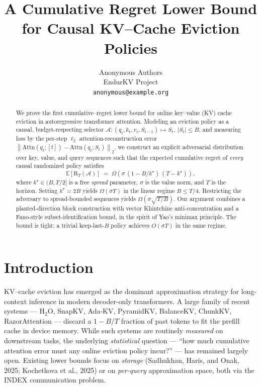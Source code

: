 \documentclass{article}
\title{A Cumulative Regret Lower Bound for Causal KV--Cache Eviction Policies}
\author{%
  Anonymous Authors \\
  EndurKV Project \\
  \texttt{anonymous@example.org}
}
\theoremstyle{definition}
\theoremstyle{remark}
\newcommand{\E}{\mathbb{E}}
\newcommand{\A}{\mathcal{A}}
\newcommand{\Reg}{\mathrm{R}}
\newcommand{\Attn}{\mathrm{Attn}}
\newcommand{\norm}[1]{\left\lVert #1 \right\rVert}
\begin{document}
\maketitle

\begin{abstract}
We prove the first cumulative--regret lower bound for online key--value (KV) cache eviction in autoregressive transformer attention. Modeling an eviction policy as a causal, budget-respecting selector $\A:(q_t,k_t,v_t,S_{t-1})\mapsto S_t,\ |S_t|\le B$, and measuring loss by the per-step $\ell_2$ attention-reconstruction error $\norm{\Attn(q_t;[t])-\Attn(q_t;S_t)}_2$, we construct an explicit adversarial distribution over key, value, and query sequences such that the expected cumulative regret of \emph{every} causal randomized policy satisfies
\[
\E[\Reg_T(\A)] \;=\; \Omega\!\left(\sigma\,(1-B/k^\star)\,(T-k^\star)\right),
\]
where $k^\star\in(B,T/2]$ is a free \emph{spread} parameter, $\sigma$ is the value norm, and $T$ is the horizon. Setting $k^\star=2B$ yields $\Omega(\sigma T)$ in the linear regime $B\le T/4$. Restricting the adversary to spread-bounded sequences yields $\Omega(\sigma\sqrt{T/B})$. Our argument combines a planted-direction block construction with vector Khintchine anti-concentration and a Fano-style subset-identification bound, in the spirit of Yao's minimax principle. The bound is tight: a trivial keep-last-$B$ policy achieves $O(\sigma T)$ in the same regime.
\end{abstract}

\section{Introduction}
\label{sec:intro}

KV--cache eviction has emerged as the dominant approximation strategy for long-context inference in modern decoder-only transformers. A large family of recent systems --- $\text{H}_2\text{O}$, SnapKV, Ada-KV, PyramidKV, BalanceKV, ChunkKV, RazorAttention --- discard a $1-B/T$ fraction of past tokens to fit the prefill cache in device memory. While such systems are routinely \emph{measured} on downstream tasks, the underlying \emph{statistical} question --- ``how much cumulative attention error must any online eviction policy incur?'' --- has remained largely open. Existing lower bounds focus on \emph{storage} (Sadhukhan, Haris, and Onak, 2025; Kochetkova et al., 2025) or on \emph{per-query} approximation space, both via the INDEX communication problem.
\end{document}

